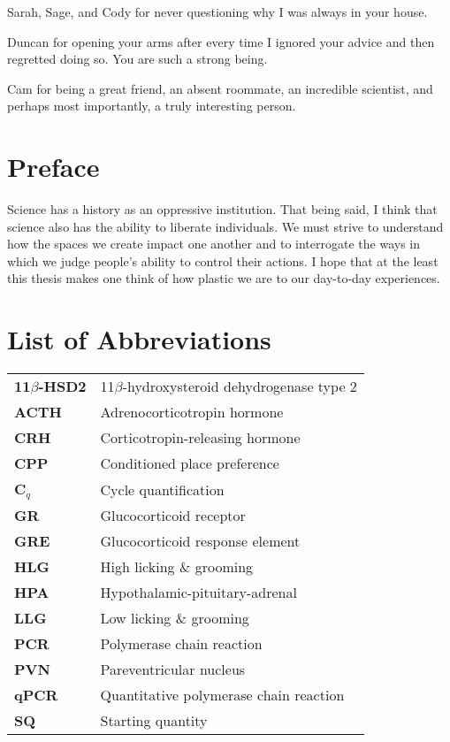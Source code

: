 \documentclass[12pt,twoside]{reedthesis}
\begin{document}
  Sarah, Sage, and Cody for never questioning why I was always in your house.
	
	Duncan for opening your arms after every time I ignored your advice and then regretted doing so. You are such a strong being.
	
	Cam for being a great friend, an absent roommate, an incredible scientist, and perhaps most importantly, a truly interesting person.
	

    \chapter*{Preface}
	Science has a history as an oppressive institution. That being said, I think
  that science also has the ability to liberate individuals. We must strive to understand how
the spaces we create impact one another and to interrogate the ways in which we
judge people's ability to control their actions. I hope that at the
  least this thesis makes one think of how plastic we are to our day-to-day experiences.

    \chapter*{List of Abbreviations}

	\begin{table}[h]
	\centering %
	\begin{tabular}{ll}
    \textbf{11$\beta$-HSD2} & 11$\beta$-hydroxysteroid dehydrogenase type 2\\
    \textbf{ACTH} & Adrenocorticotropin hormone\\
    \textbf{CRH} & Corticotropin-releasing hormone \\
    \textbf{CPP} & Conditioned place preference\\
    \textbf{C$_q$} & Cycle quantification \\
    \textbf{GR} & Glucocorticoid receptor \\
    \textbf{GRE} & Glucocorticoid response element \\
    \textbf{HLG} & High licking \& grooming \\
    \textbf{HPA} & Hypothalamic-pituitary-adrenal \\
    \textbf{LLG} & Low licking \& grooming \\
    \textbf{PCR} & Polymerase chain reaction\\
    \textbf{PVN} & Pareventricular nucleus \\
    \textbf{qPCR} & Quantitative polymerase chain reaction\\
    \textbf{SQ} & Starting quantity \\
   	\end{tabular}
	\end{table}
	
\end{document}

